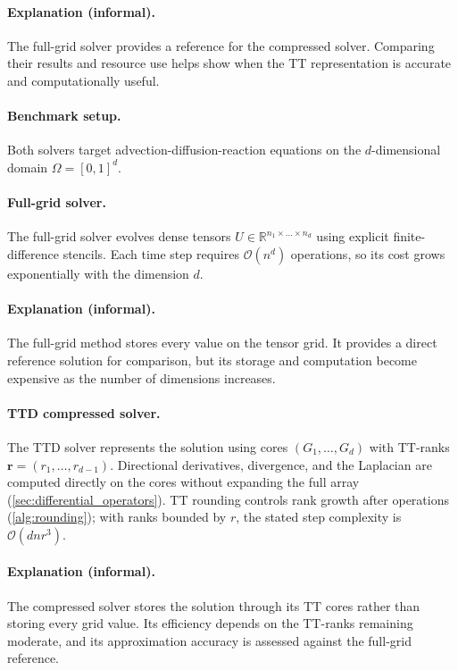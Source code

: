 \documentclass[11pt,a4paper,parskip=half-]{scrartcl}
\theoremstyle{definition}
\theoremstyle{plain}
\theoremstyle{remark}
\begin{document}
\paragraph{Explanation (informal).}
The full-grid solver provides a reference for the compressed solver. Comparing
their results and resource use helps show when the TT representation is
accurate and computationally useful.

\paragraph{Benchmark setup.}
Both solvers target advection-diffusion-reaction equations on the
$d$-dimensional domain $\Omega = [0, 1]^d$.

\paragraph{Full-grid solver.}
The full-grid solver evolves dense tensors
$U \in \mathbb{R}^{n_1 \times \dots \times n_d}$ using explicit
finite-difference stencils. Each time step requires $\mathcal{O}(n^d)$
operations, so its cost grows exponentially with the dimension $d$.

\paragraph{Explanation (informal).}
The full-grid method stores every value on the tensor grid. It provides a
direct reference solution for comparison, but its storage and computation
become expensive as the number of dimensions increases.

\paragraph{TTD compressed solver.}
The TTD solver represents the solution using cores
$(G_1, \dots, G_d)$ with TT-ranks $\mathbf{r} = (r_1, \dots, r_{d-1})$.
Directional derivatives, divergence, and the Laplacian are computed directly
on the cores without expanding the full array
(\cref{sec:differential_operators}). TT rounding controls rank growth after
operations (\cref{alg:rounding}); with ranks bounded by $r$, the stated step
complexity is $\mathcal{O}(d n r^3)$.

\paragraph{Explanation (informal).}
The compressed solver stores the solution through its TT cores rather than
storing every grid value. Its efficiency depends on the TT-ranks remaining
moderate, and its approximation accuracy is assessed against the full-grid
reference.
\end{document}
